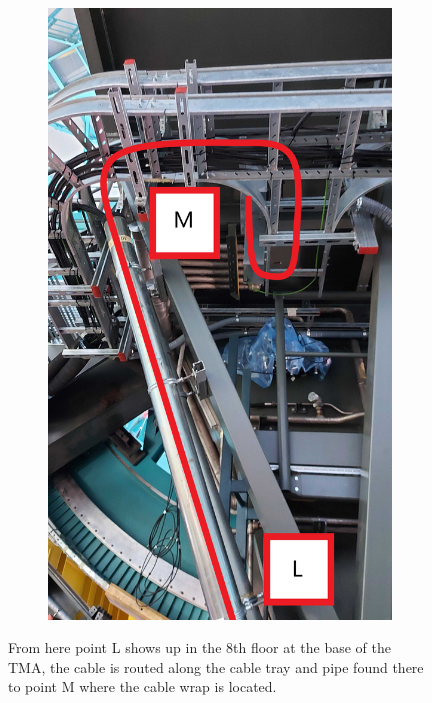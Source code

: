 \begin{figure}
\begin{subfigure}{0.40\textwidth}
      \includegraphics[width=\textwidth]{images/27-1.jpg}
    \end{subfigure}
    \caption*{From here point L shows up in the 8th floor at the base of the TMA, the cable is routed along the cable tray and pipe found there to point M where the cable wrap is located.}
  \end{figure}

\newpage

